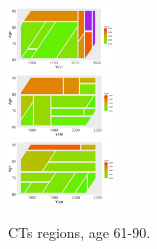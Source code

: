 \documentclass[fleqn,10pt]{wlscirep}
\begin{document}
\begin{figure}[H]
{\includegraphics[width=0.25\textwidth]{gbm_61_b.jpeg}}\\
{\includegraphics[width=0.25\textwidth]{xgbm_61_b.jpeg}}\\
{\includegraphics[width=0.25\textwidth]{xgbm_preproc_61_b.jpeg}}\\
\caption{CTs regions, age 61-90.}
\label{fig:CT2}
\end{figure}

\end{document}
